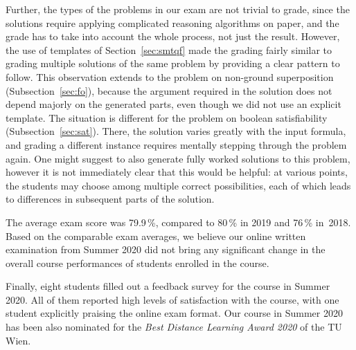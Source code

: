 Further, the types of the problems in our exam are not trivial to grade, since
the solutions require applying complicated reasoning algorithms on paper, and
the grade has to take into account the whole process, not just the result.
However, the use of templates of Section~\ref{sec:smtqf}
made the grading fairly similar to grading multiple
solutions of the same problem by providing a clear pattern to follow.
%
This observation extends to %
the problem on non-ground superposition (Subsection~\ref{sec:fo}),
because the argument required in the solution does not depend majorly on the generated parts,
even though we did not use an explicit template.
%
The situation is different for %
the problem on boolean satisfiability (Subsection~\ref{sec:sat}).
There, the solution varies greatly with the input formula,
and grading a different instance requires mentally stepping through the problem again.
One might suggest to also generate fully worked solutions to this problem,
however it is not immediately clear that this would be helpful:
at various points, the students may choose among multiple correct possibilities,
each of which leads to differences in subsequent parts of the solution.

The average exam score was 79.9\,\%, compared to 80\,\% in 2019 and 76\,\%
in~2018. Based on the comparable exam averages, we believe
our online written examination from Summer 2020 did not bring any
significant change in the overall course performances of students
enrolled in the course. %

Finally, eight students filled out a feedback survey for the course in
Summer 2020. All of them reported
high levels of satisfaction with the course, with one student explicitly praising the
online exam format. Our course in Summer 2020 has been also nominated
for the {\it Best Distance Learning Award 2020} of the TU Wien. 

